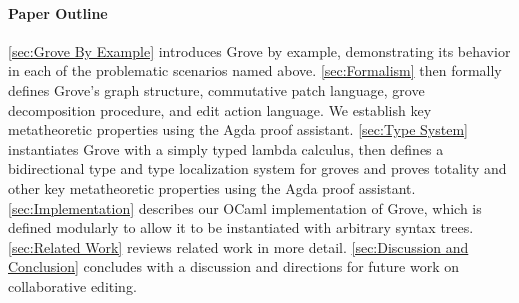 \paragraph{Paper Outline}

\autoref{sec:Grove By Example} introduces Grove by example, demonstrating its behavior in each of the problematic scenarios named above. 
\autoref{sec:Formalism} then formally defines Grove's graph structure, commutative patch language, grove decomposition procedure, and edit action language. We establish key metatheoretic properties using the Agda proof assistant. 
\autoref{sec:Type System} instantiates Grove with a simply typed lambda calculus, then defines a bidirectional type and type localization system for groves and proves totality and other key metatheoretic properties using the Agda proof assistant. 
\autoref{sec:Implementation} describes our OCaml implementation of Grove, which is defined modularly to allow it to be instantiated with arbitrary syntax trees. 
\autoref{sec:Related Work} reviews related work in more detail. 
\autoref{sec:Discussion and Conclusion} concludes with a discussion and directions for future work on collaborative editing.






